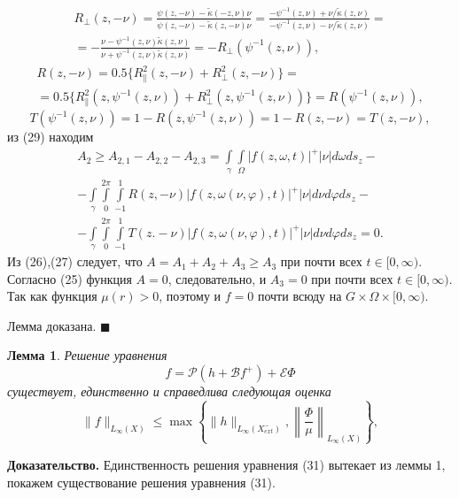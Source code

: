 \documentclass[12pt,reqno]{report}
\newtheorem{lemma}{Лемма}
\begin{document}
\begin{multline}
R_{\bot}(z,-\nu)=\frac{\psi(z,-\nu)-\widetilde{\kappa}(-z,\nu)\nu}
{\psi(z,-\nu)-\widetilde{\kappa}(z,-\nu)\nu}= \frac{-
	\psi^{-1}(z,\nu)+\nu/\widetilde{\kappa}(z,\nu)}{-
	\psi^{-1}(z,\nu)-\nu/\widetilde{\kappa}(z,\nu)}= \\ = -\frac{ \nu -
	\psi^{-1}(z,\nu)\widetilde{\kappa}(z,\nu)}{\nu+
	\psi^{-1}(z,\nu)\widetilde{\kappa}(z,\nu)} =-R_{\bot}(\psi^{-1}(z,\nu)), \nonumber
\end{multline}
\begin{multline}
R(z,-\nu)=0.5\{R^2_{\|}(z,-\nu) +R^2_{\bot}(z,-\nu)\}= \\=
0.5\{R^2_{\|}(z,\psi^{-1}(z,\nu)) +R^2_{\bot}(z,\psi^{-1}(z,\nu))\}=
R(\psi^{-1}(z,\nu)), \nonumber
\end{multline}
$$
T(\psi^{-1}(z,\nu))=1-R(z,\psi^{-1}(z,\nu))=1-R(z,-\nu)=T(z,-\nu),
$$
из (29) находим
\begin{multline}
A_2 \geq  A_{2,1}- A_{2,2} - A_{2,3}=  \int \limits_{\gamma} \int \limits_{\Omega}| f
(z,\omega,t)|^+|\nu | d\omega d s_z - 
\\-
\int \limits_{\gamma} \int
\limits^{2\pi}_{0} \int \limits^{1}_{-1} R(z,-\nu)
|f(z,\omega(\nu,\varphi),t)|^+ |\nu| d \nu d \varphi  d s_z - \\-
\int \limits_{\gamma}
\int
\limits^{2\pi}_{0} \int \limits^{1}_{-1} 
T(z.-\nu) |f(z,\omega(\nu,\varphi),t)|^+ |\nu| d \nu d
\varphi  d s_z=0.
\end{multline}
Из (26),(27) следует, что $A=A_1+A_2+A_3 \geq A_3$ при почти всех
$t\in [0,\infty)$. Согласно (25) функция $A=0$, следовательно, и
$A_3=0$ при почти всех $t\in [0,\infty)$. Так как функция $\mu(r) > 0$,
поэтому и $f=0$ почти всюду на $G \times \Omega \times
[0,\infty)$. 


Лемма доказана. 
$\blacksquare$


\begin{lemma}
	Решение уравнения
	\begin{equation}
	f= \mathcal P (h+\mathcal B f^+) + \mathcal E \Phi
	\end{equation}
	существует, единственно и справедлива следующая оценка
	\begin{equation}
	\|f\|_{L_{\infty}(X)} \leq \max \left \{ \| h \|_{L_{\infty}(X^-_{ext})}, \left
	\|\frac{\Phi}{\mu} \right\|_{L_{\infty}(X)}\right\},
	\end{equation}
\end{lemma}
{\bf Доказательство.} Единственность решения уравнения (31)
вытекает из леммы 1, покажем существование решения уравнения (31).
\end{document}
